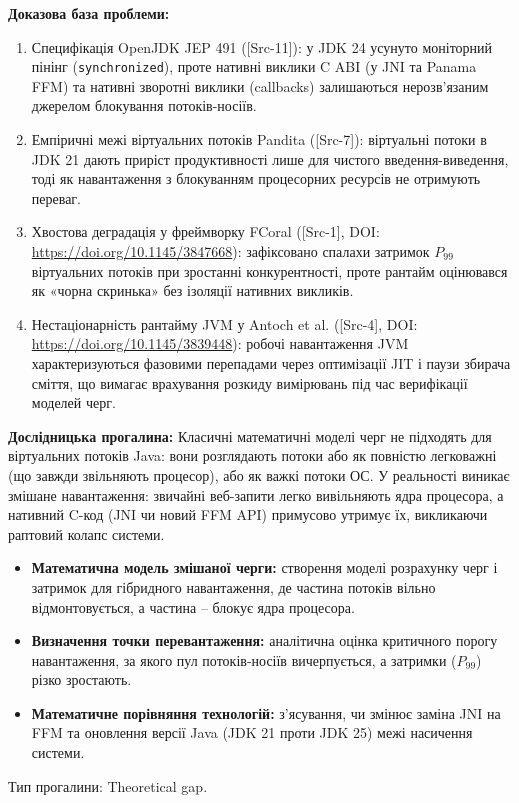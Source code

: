 \textbf{Доказова база проблеми:} 
\begin{enumerate}[wide]
    \item Специфікація OpenJDK JEP 491 ([Src-11]): у JDK 24 усунуто моніторний пінінг (\texttt{synchronized}), проте нативні виклики C ABI (у JNI та Panama FFM) та нативні зворотні виклики (callbacks) залишаються нерозв'язаним джерелом блокування потоків-носіїв.
    \item Емпіричні межі віртуальних потоків Pandita ([Src-7]): віртуальні потоки в JDK 21 дають приріст продуктивності лише для чистого введення-виведення, тоді як навантаження з блокуванням процесорних ресурсів не отримують переваг.
    \item Хвостова деградація у фреймворку FCoral ([Src-1], DOI: \url{https://doi.org/10.1145/3847668}): зафіксовано спалахи затримок $P_{99}$ віртуальних потоків при зростанні конкурентності, проте рантайм оцінювався як «чорна скринька» без ізоляції нативних викликів.
    \item Нестаціонарність рантайму JVM у Antoch et al. ([Src-4], DOI: \url{https://doi.org/10.1145/3839448}): робочі навантаження JVM характеризуються фазовими перепадами через оптимізації JIT і паузи збирача сміття, що вимагає врахування розкиду вимірювань під час верифікації моделей черг.
\end{enumerate}

\textbf{Дослідницька прогалина:} Класичні математичні моделі черг не підходять для віртуальних потоків Java: вони розглядають потоки або як повністю легковажні (що завжди звільняють процесор), або як важкі потоки ОС. У реальності виникає змішане навантаження: звичайні веб-запити легко вивільняють ядра процесора, а нативний C-код (JNI чи новий FFM API) примусово утримує їх, викликаючи раптовий колапс системи.
\begin{itemize}[wide]
    \item \textbf{Математична модель змішаної черги:} створення моделі розрахунку черг і затримок для гібридного навантаження, де частина потоків вільно відмонтовується, а частина -- блокує ядра процесора.
    \item \textbf{Визначення точки перевантаження:} аналітична оцінка критичного порогу навантаження, за якого пул потоків-носіїв вичерпується, а затримки ($P_{99}$) різко зростають.
    \item \textbf{Математичне порівняння технологій:} з'ясування, чи змінює заміна JNI на FFM та оновлення версії Java (JDK 21 проти JDK 25) межі насичення системи.
\end{itemize}
Тип прогалини: Theoretical gap.

